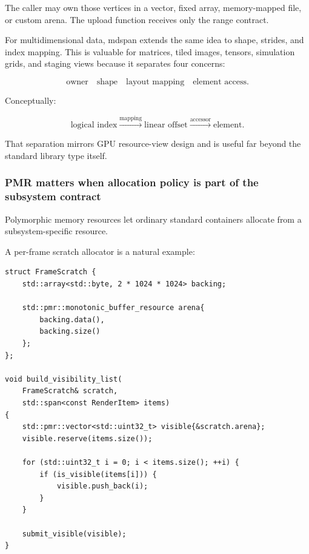 The caller may own those vertices in a vector, fixed array, memory-mapped file, or custom arena. The upload function receives only the range contract.

For multidimensional data, mdspan extends the same idea to shape, strides, and index mapping. This is valuable for matrices, tiled images, tensors, simulation grids, and staging views because it separates four concerns:

\[
\text{owner}
\quad
\text{shape}
\quad
\text{layout mapping}
\quad
\text{element access}.
\]

Conceptually:

\[
\text{logical index}
\overset{\text{mapping}}{\longrightarrow}
\text{linear offset}
\overset{\text{accessor}}{\longrightarrow}
\text{element}.
\]

That separation mirrors GPU resource-view design and is useful far beyond the standard library type itself.

\subsubsection{PMR matters when allocation policy is part of the subsystem contract}\label{01-foundations-i-ch005-pmr-matters-when-allocation-policy-is-part-of-the-subsystem-contract}

\hypertarget{01-foundations-i-ch005-pmr-matters-when-allocation-policy-is-part-of-the-subsystem-contract}{}

Polymorphic memory resources let ordinary standard containers allocate from a subsystem-specific resource.

A per-frame scratch allocator is a natural example:

\begin{verbatim}
struct FrameScratch {
    std::array<std::byte, 2 * 1024 * 1024> backing;

    std::pmr::monotonic_buffer_resource arena{
        backing.data(),
        backing.size()
    };
};

void build_visibility_list(
    FrameScratch& scratch,
    std::span<const RenderItem> items)
{
    std::pmr::vector<std::uint32_t> visible{&scratch.arena};
    visible.reserve(items.size());

    for (std::uint32_t i = 0; i < items.size(); ++i) {
        if (is_visible(items[i])) {
            visible.push_back(i);
        }
    }

    submit_visible(visible);
}
\end{verbatim}

